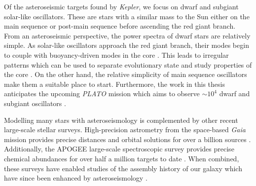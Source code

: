 
Of the asteroseismic targets found by \emph{Kepler}, we focus on dwarf and subgiant solar-like oscillators. These are stars with a similar mass to the Sun either on the main sequence or post-main sequence before ascending the red giant branch. From an asteroseismic perspective, the power spectra of dwarf stars are relatively simple. As solar-like oscillators approach the red giant branch, their modes begin to couple with buoyancy-driven modes in the core \citep{Bedding.Mosser.ea2011,Mosser.Barban.ea2011}. This leads to irregular patterns which can be used to separate evolutionary state and study properties of the core \citep[e.g.][]{Mosser.Vrard.ea2015}. On the other hand, the relative simplicity of main sequence oscillators make them a suitable place to start. Furthermore, the work in this thesis anticipates the upcoming \emph{PLATO} mission which aims to observe \(\sim 10^4\) dwarf and subgiant oscillators \citep{Rauer.Aerts.ea2016}.


Modelling many stars with asteroseismology is complemented by other recent large-scale stellar surveys. High-precision astrometry from the space-based \emph{Gaia} mission provides precise distances and orbital solutions for over a billion sources \citep{GaiaCollaboration.Prusti.ea2016}. Additionally, the APOGEE large-scale spectroscopic survey provides precise chemical abundances for over half a million targets to date \citep{Majewski.Schiavon.ea2017,Jonsson.Holtzman.ea2020}. When combined, these surveys have enabled studies of the assembly history of our galaxy \citep[e.g.][]{Helmi.Babusiaux.ea2018} which have since been enhanced by asteroseismology \citep{Chaplin.Serenelli.ea2020,Montalban.Mackereth.ea2021}.

